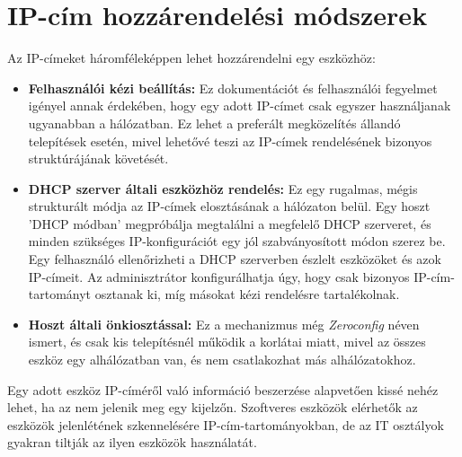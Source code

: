 \section{IP-cím hozzárendelési módszerek}
Az IP-címeket háromféleképpen lehet hozzárendelni egy eszközhöz:
\begin{itemize}
    \item \textbf{Felhasználói kézi beállítás:}
    Ez dokumentációt és felhasználói fegyelmet igényel annak érdekében,
	hogy egy adott IP-címet csak egyszer használjanak ugyanabban a hálózatban.
	Ez lehet a preferált megközelítés állandó telepítések esetén,
	mivel lehetővé teszi az IP-címek rendelésének bizonyos struktúrájának követését.
    
    \item \textbf{DHCP szerver általi eszközhöz rendelés:}
    Ez egy rugalmas, mégis strukturált módja az IP-címek elosztásának a hálózaton belül.
	Egy hoszt 'DHCP módban' megpróbálja megtalálni a megfelelő DHCP szerveret,
	és minden szükséges IP-konfigurációt egy jól szabványosított módon szerez be.
	Egy felhasználó ellenőrizheti a DHCP szerverben észlelt eszközöket és azok IP-címeit.
	Az adminisztrátor konfigurálhatja úgy, hogy csak bizonyos IP-cím-tartományt osztanak ki,
	míg másokat kézi rendelésre tartalékolnak.
    
    \item \textbf{Hoszt általi önkiosztással:}
    Ez a mechanizmus még \textit{Zeroconfig} néven ismert, és csak kis telepítésnél
	működik a korlátai miatt, mivel az összes eszköz egy alhálózatban van,
	és nem csatlakozhat más alhálózatokhoz.
\end{itemize}
Egy adott eszköz IP-címéről való információ beszerzése alapvetően kissé nehéz lehet,
ha az nem jelenik meg egy kijelzőn. 
Szoftveres eszközök elérhetők az eszközök jelenlétének szkennelésére IP-cím-tartományokban,
de az IT osztályok gyakran tiltják az ilyen eszközök használatát.


